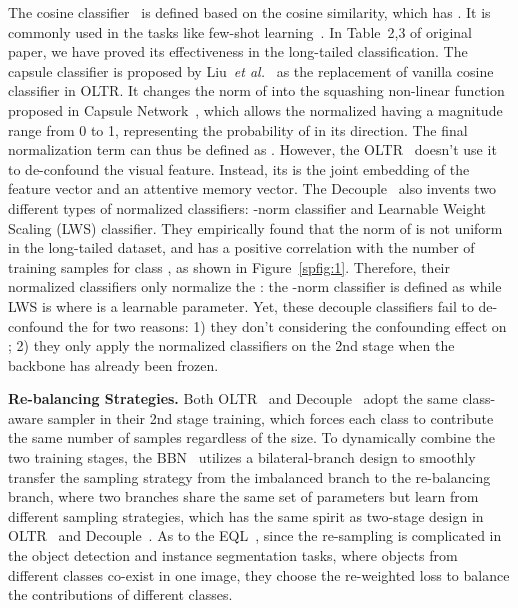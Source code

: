 \documentclass{article}
\newcommand{\etal}{\textit{et al.}}
\begin{document}
The cosine classifier~\cite{gidaris2018dynamic, qi2018low} is defined based on the cosine similarity, which has . It is commonly used in the tasks like few-shot learning~\cite{chen2019closer}. In Table~2,3 of original paper, we have proved its effectiveness in the long-tailed classification. The capsule classifier is proposed by Liu~\etal~\cite{liu2019large} as the replacement of vanilla cosine classifier in OLTR. It changes the  norm of  into the squashing non-linear function proposed in Capsule Network~\cite{sabour2017dynamic}, which allows the normalized  having a magnitude range from 0 to 1, representing the probability of  in its direction. The final normalization term can thus be defined as . However, the OLTR~\cite{liu2019large} doesn't use it to de-confound the visual feature. Instead, its  is the joint embedding of the feature vector and an attentive memory vector. The Decouple~\cite{kang2019decoupling} also invents two different types of normalized classifiers: -norm classifier and Learnable Weight Scaling (LWS) classifier. They empirically found that the  norm of  is not uniform in the long-tailed dataset, and has a positive correlation with the number of training samples for class , as shown in Figure~\ref{spfig:1}. Therefore, their normalized classifiers only normalize the : the -norm classifier is defined as  while LWS is  where  is a learnable parameter. Yet, these decouple classifiers fail to de-confound the  for two reasons: 1) they don't considering the confounding effect on ; 2) they only apply the normalized classifiers on the 2nd stage when the backbone has already been frozen. 



\textbf{Re-balancing Strategies.} Both OLTR~\cite{liu2019large} and Decouple~\cite{kang2019decoupling} adopt the same class-aware sampler in their 2nd stage training, which forces each class to contribute the same number of samples regardless of the size. To dynamically combine the two training stages, the BBN~\cite{zhou2019bbn} utilizes a bilateral-branch design to smoothly transfer the sampling strategy from the imbalanced branch to the re-balancing branch, where two branches share the same set of parameters but learn from different sampling strategies, which has the same spirit as two-stage design in OLTR~\cite{liu2019large} and Decouple~\cite{kang2019decoupling}. As to the EQL~\cite{tan2020equalization}, since the re-sampling is complicated in the object detection and instance segmentation tasks, where objects from different classes co-exist in one image, they choose the re-weighted loss to balance the contributions of different classes. 
\end{document}

